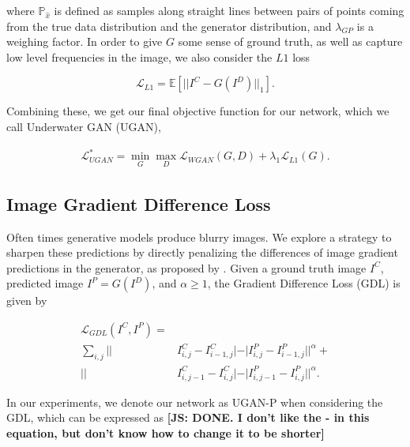 \documentclass[letterpaper, 10pt, conference]{ieeeconf}
\newcommand{\marginlabel}[1]{\mbox{}\marginpar[\raggedleft\hspace{0pt}{#1}]{
\raggedright\hspace{0pt}{#1}}}
\newcommand{\starnote}[1]{\marginlabel{$\bigstar$}\textbf{[#1]}}
\begin{document}
\noindent where $\mathbb{P}_{\hat{x}}$ is defined as samples along straight lines between pairs of points coming from
the true data distribution and the generator distribution, and $\lambda_{GP}$ is a weighing factor. In order to give $G$
some sense of ground truth, as well as capture low level frequencies in the image, we also consider the $L1$ loss

\begin{equation}
   \mathcal{L}_{L1} = \mathbb{E} [ || I^C - G(I^D) ||_1 ].
\end{equation}

\noindent Combining these, we get our final objective function for our network, which we call Underwater GAN (UGAN),

\begin{equation}
   \begin{aligned}
      \mathcal{L}_{UGAN}^* = \min\limits_{G}\max\limits_{D} \mathcal{L}_{WGAN}(G,D) + \lambda_{1} \mathcal{L}_{L1}(G).
   \end{aligned}
\end{equation}


\subsection{Image Gradient Difference Loss}
Often times generative models produce blurry images. We explore a strategy to sharpen these predictions by
directly penalizing the differences of image gradient predictions in the generator, as proposed by
\cite{mathieu2015deep}. Given a ground truth image $I^C$, predicted image $I^P = G(I^D)$, and $\alpha \geq 1$, the
Gradient Difference Loss (GDL) is given by

\begin{equation}
   \begin{aligned}
      \mathcal{L}_{GDL}(I^C, I^P) = \\ \sum\limits_{i,j} || & I^C_{i,j} - I^C_{i-1,j}| - | I^P_{i,j} - I^P_{i-1,j}||^{\alpha} + \\
      || & I^C_{i,j-1} - I^C_{i,j}| - | I^P_{i,j-1} - I^P_{i,j}||^{\alpha}.
   \end{aligned}
   \label{gdl_eq}
\end{equation}

\noindent In our experiments, we denote our network as UGAN-P when considering the GDL, which can be expressed as
\starnote{JS: DONE. I don't like the - in this equation, but don't know how to change it to be shorter}
\end{document}
